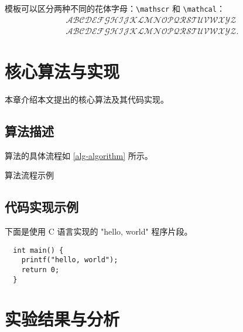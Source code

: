\documentclass{sysuthesis}
\begin{document}
模板可以区分两种不同的花体字母：\verb|\mathscr| 和 \verb|\mathcal|：
\begin{gather*}
  \mathscr{A} \mathscr{B} \mathscr{C} \mathscr{D} \mathscr{E} \mathscr{F} \mathscr{G} \mathscr{H} \mathscr{I} \mathscr{J} \mathscr{K} \mathscr{L} \mathscr{M} \mathscr{N} \mathscr{O} \mathscr{P} \mathscr{Q} \mathscr{R} \mathscr{S} \mathscr{T} \mathscr{U} \mathscr{V} \mathscr{W} \mathscr{X} \mathscr{Y} \mathscr{Z}\\
  \mathcal{A} \mathcal{B} \mathcal{C} \mathcal{D} \mathcal{E} \mathcal{F} \mathcal{G} \mathcal{H} \mathcal{I} \mathcal{J} \mathcal{K} \mathcal{L} \mathcal{M} \mathcal{N} \mathcal{O} \mathcal{P} \mathcal{Q} \mathcal{R} \mathcal{S} \mathcal{T} \mathcal{U} \mathcal{V} \mathcal{W} \mathcal{X} \mathcal{Y} \mathcal{Z}.
\end{gather*}

\chapter{核心算法与实现}

本章介绍本文提出的核心算法及其代码实现。

\section{算法描述}

算法的具体流程如 \autoref{alg-algorithm} 所示。

\begin{algorithm}[H]
  \caption{算法流程示例}
  \label{alg-algorithm}
\end{algorithm}

\section{代码实现示例}

下面是使用 C 语言实现的 "hello, world" 程序片段。

\begin{verbatim}
  int main() {
    printf("hello, world");
    return 0;
  }
\end{verbatim}

\chapter{实验结果与分析}
\end{document}
